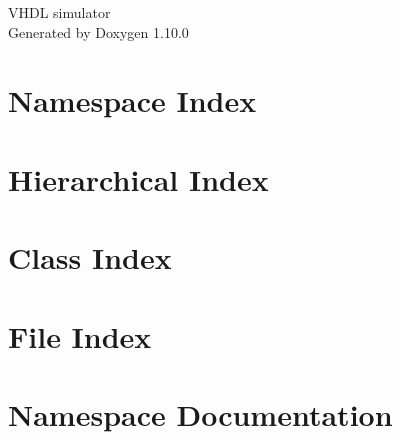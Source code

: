 \documentclass[twoside]{book}
\newcommand{\+}{\discretionary{\mbox{\scriptsize$\hookleftarrow$}}{}{}}
\newcommand{\clearemptydoublepage}{%
    \newpage{\pagestyle{empty}\cleardoublepage}%
  }
\begin{document}
  \raggedbottom
    \hypersetup{pageanchor=false,
                bookmarksnumbered=true,
                pdfencoding=unicode
               }
  \begin{titlepage}
  \vspace*{7cm}
  \begin{center}%
  {\Large VHDL simulator}\\
  \vspace*{1cm}
  {\large Generated by Doxygen 1.10.0}\\
  \end{center}
  \end{titlepage}
  \clearemptydoublepage
  \tableofcontents
  \clearemptydoublepage
  \hypersetup{pageanchor=true}

\chapter{Namespace Index}

\chapter{Hierarchical Index}

\chapter{Class Index}

\chapter{File Index}

\chapter{Namespace Documentation}


\end{document}
